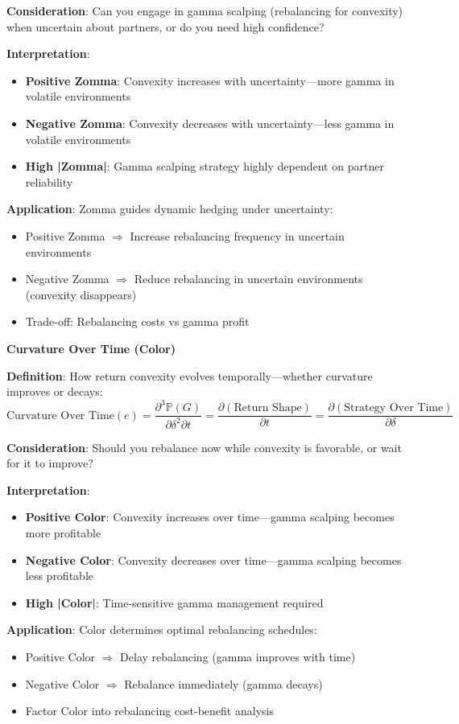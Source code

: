 \textbf{Consideration}: Can you engage in gamma scalping (rebalancing for convexity) when uncertain about partners, or do you need high confidence?

\textbf{Interpretation}:
\begin{itemize}
\item \textbf{Positive Zomma}: Convexity increases with uncertainty---more gamma in volatile environments
\item \textbf{Negative Zomma}: Convexity decreases with uncertainty---less gamma in volatile environments
\item \textbf{High |Zomma|}: Gamma scalping strategy highly dependent on partner reliability
\end{itemize}

\textbf{Application}: Zomma guides dynamic hedging under uncertainty:
\begin{itemize}
\item Positive Zomma $\Rightarrow$ Increase rebalancing frequency in uncertain environments
\item Negative Zomma $\Rightarrow$ Reduce rebalancing in uncertain environments (convexity disappears)
\item Trade-off: Rebalancing costs vs gamma profit
\end{itemize}

\textbf{Curvature Over Time (Color)}

\textbf{Definition}: How return convexity evolves temporally---whether curvature improves or decays:
\[ \text{Curvature Over Time}(e) = \frac{\partial^3 \mathbb{P}(G)}{\partial \delta^2 \partial t} = \frac{\partial (\text{Return Shape})}{\partial t} = \frac{\partial (\text{Strategy Over Time})}{\partial \delta} \]

\textbf{Consideration}: Should you rebalance now while convexity is favorable, or wait for it to improve?

\textbf{Interpretation}:
\begin{itemize}
\item \textbf{Positive Color}: Convexity increases over time---gamma scalping becomes more profitable
\item \textbf{Negative Color}: Convexity decreases over time---gamma scalping becomes less profitable
\item \textbf{High |Color|}: Time-sensitive gamma management required
\end{itemize}

\textbf{Application}: Color determines optimal rebalancing schedules:
\begin{itemize}
\item Positive Color $\Rightarrow$ Delay rebalancing (gamma improves with time)
\item Negative Color $\Rightarrow$ Rebalance immediately (gamma decays)
\item Factor Color into rebalancing cost-benefit analysis
\end{itemize}

